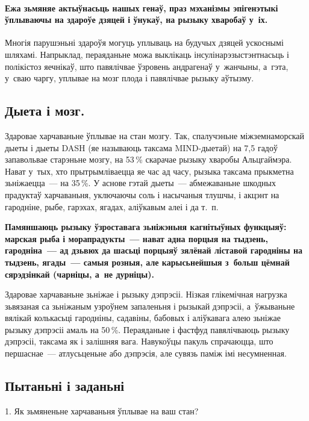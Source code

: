 \paragraph{Ежа зьмяняе актыўнасьць нашых генаў, праз мэханізмы эпігенэтыкі ўплываючы на здароўе дзяцей і ўнукаў, на рызыку хваробаў у~іх.} Многія парушэньні здароўя могуць уплываць на будучых дзяцей ускоснымі шляхамі. Напрыклад, пераяданьне можа выклікаць інсулінарэзыстэнтнасьць і полікістоз яечнікаў, што павялічвае ўзровень андрагенаў у~жанчыны, а~гэта, у~сваю чаргу, уплывае на мозг плода і павялічвае рызыку аўтызму.

\subsection*{Дыета і мозг.}
Здаровае харчаваньне ўплывае на стан мозгу. Так, спалучэньне міжземнаморскай дыеты і дыеты DASH (яе называюць таксама MIND-дыетай) на 7,5 гадоў запавольвае старэньне мозгу, на 53\,\% скарачае рызыку хваробы Альцгаймэра. Нават у~тых, хто прытрымліваецца яе час ад часу, рызыка таксама прыкметна зьніжаецца~--- на 35\,\%. У аснове гэтай дыеты~--- абмежаваньне шкодных прадуктаў харчаваньня, уключаючы соль і насычаныя тлушчы, і акцэнт на гародніне, рыбе, гарэхах, ягадах, аліўкавым алеі і да т.~п.

\textbf{Памяншаюць рызыку ўзроставага зьніжэньня кагнітыўных функцыяў: марская рыба і морапрадукты~--- нават адна порцыя на тыдзень, гародніна~--- ад дзьвюх да шасьці порцыяў зялёнай ліставой гародніны на тыдзень, ягады~--- самыя розныя, але карысьнейшыя з~больш цёмнай сярэдзінкай (чарніцы, а~не дурніцы).}

Здаровае харчаваньне зьніжае і рызыку дэпрэсіі. Нізкая глікемічная нагрузка зьвязаная са зьніжаным узроўнем запаленьня і рызыкай дэпрэсіі, а~ўжываньне вялікай колькасьці гародніны, садавіны, бабовых і аліўкавага алею зьніжае рызыку дэпрэсіі амаль на 50\,\%. Пераяданьне і фастфуд павялічваюць рызыку дэпрэсіі, таксама як і залішняя вага. Навукоўцы пакуль спрачаюцца, што першаснае~--- атлусьценьне або дэпрэсія, але сувязь паміж імі несумненная.

\subsection*{Пытаньні і заданьні}

1. Як зьмяненьне харчаваньня ўплывае на ваш стан?

